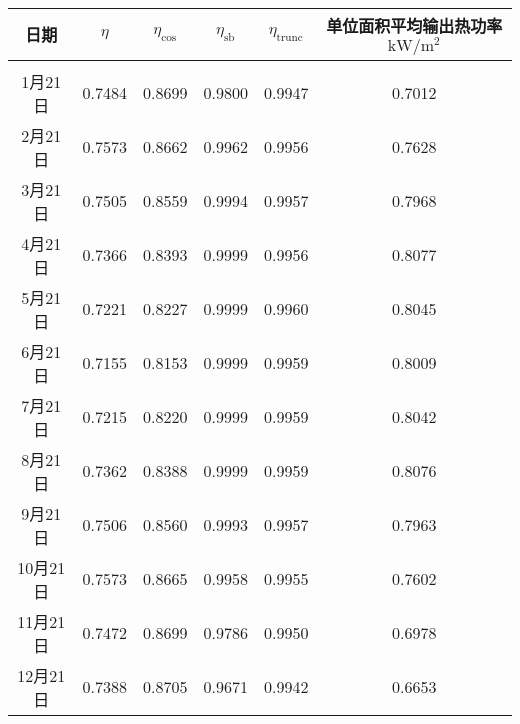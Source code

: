 \begin{tabular}{|c|ccccc|}
\hline
日期 & \(\eta\) & \(\eta _{\cos}\) & \(\eta _{\mathrm{s b}}\) & \(\eta _{\mathrm{trunc}}\) & 单位面积平均输出热功率\(\mathrm{kW}/\mathrm{m}^{2}\)\\
\hline
\\[-1em]
1月21日  & 0.7484 & 0.8699 & 0.9800 & 0.9947 & 0.7012\\
2月21日  & 0.7573 & 0.8662 & 0.9962 & 0.9956 & 0.7628\\
3月21日  & 0.7505 & 0.8559 & 0.9994 & 0.9957 & 0.7968\\
4月21日  & 0.7366 & 0.8393 & 0.9999 & 0.9956 & 0.8077\\
5月21日  & 0.7221 & 0.8227 & 0.9999 & 0.9960 & 0.8045\\
6月21日  & 0.7155 & 0.8153 & 0.9999 & 0.9959 & 0.8009\\
7月21日  & 0.7215 & 0.8220 & 0.9999 & 0.9959 & 0.8042\\
8月21日  & 0.7362 & 0.8388 & 0.9999 & 0.9959 & 0.8076\\
9月21日  & 0.7506 & 0.8560 & 0.9993 & 0.9957 & 0.7963\\
10月21日 & 0.7573 & 0.8665 & 0.9958 & 0.9955 & 0.7602\\
11月21日 & 0.7472 & 0.8699 & 0.9786 & 0.9950 & 0.6978\\
12月21日 & 0.7388 & 0.8705 & 0.9671 & 0.9942 & 0.6653\\
\hline
\end{tabular}
